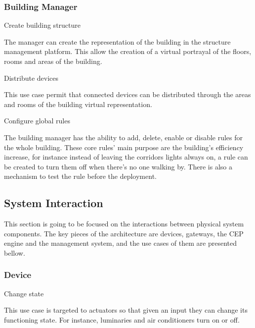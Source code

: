\subsubsection{Building Manager}

\begin{Paragraph}{Create building structure}
	
The manager can create the representation of the building in the structure management platform. This allow the creation of a virtual portrayal of the floors, rooms and areas of the building.
	
\end{Paragraph}

\begin{Paragraph}{Distribute devices}

This use case permit that connected devices can be distributed through the areas and rooms of the building virtual representation.
	
\end{Paragraph}

\begin{Paragraph}{Configure global rules}

The building manager has the ability to add, delete, enable or disable rules for the whole building. These core rules' main purpose are the building's efficiency increase, for instance instead of leaving the corridors lights always on, a rule can be created to turn them off when there's no one walking by. There is also a mechanism to test the rule before the deployment.

\end{Paragraph}


\subsection{System Interaction}
\label{Use:system}

This section is going to be focused on the interactions between physical system components. The key pieces of the architecture are  devices, gateways, the CEP engine and the management system, and the use cases of them are presented bellow.

\subsubsection{Device}
\begin{Paragraph}{Change state} %
	
This use case is targeted to actuators so that given an input they can change its functioning state. For instance, luminaries and air conditioners turn on or off.
	
\end{Paragraph}

